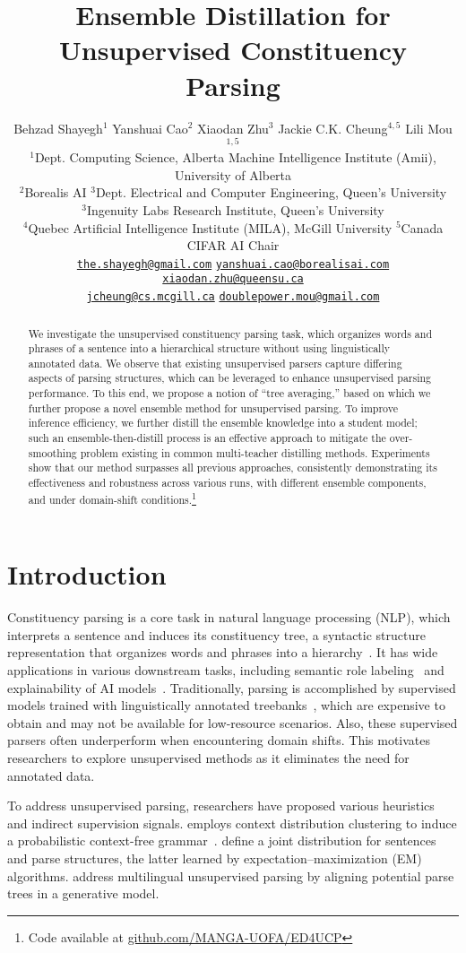 \documentclass{article}
\title{Ensemble Distillation for Unsupervised Constituency Parsing}
\author{Behzad Shayegh$^1$ \;\; Yanshuai Cao$^2$ \;\; Xiaodan Zhu$^{3}$ \;\; Jackie C.K. Cheung$^{4,5}$ \;\; Lili Mou$^{1,5}$
\\
$^1$Dept. Computing Science, Alberta Machine Intelligence Institute (Amii), University of Alberta\\
$^2$Borealis AI\quad
$^3$Dept. Electrical and Computer Engineering, Queen’s University\\
$^3$Ingenuity Labs Research Institute, Queen’s University\\
$^4$Quebec Artificial Intelligence Institute (MILA), McGill University\quad
$^5$Canada CIFAR AI Chair\\
\texttt{\href{mailto:the.shayegh@gmail.com}{the.shayegh@gmail.com}} \quad
\texttt{\href{mailto:yanshuai.cao@borealisai.com}{yanshuai.cao@borealisai.com}}\quad
\texttt{\href{mailto:xiaodan.zhu@queensu.ca}{xiaodan.zhu@queensu.ca}}\\
\texttt{\href{mailto:jcheung@cs.mcgill.ca}{jcheung@cs.mcgill.ca}} \quad
\texttt{\href{mailto:doublepower.mou@gmail.com}{doublepower.mou@gmail.com}}
}
\begin{document}
\maketitle

\begin{abstract}
We investigate the unsupervised constituency parsing task, which organizes words and phrases of a sentence into a hierarchical structure without using linguistically annotated data. We observe that existing unsupervised parsers capture differing aspects of parsing structures, which can be leveraged to enhance unsupervised parsing performance.
To this end, we propose a notion of ``tree averaging,'' based on which we further propose a novel ensemble method for unsupervised parsing.
To improve inference efficiency, we further distill the ensemble knowledge into a student model; such an ensemble-then-distill process is an effective approach to mitigate the over-smoothing problem existing in common multi-teacher distilling methods.
Experiments show that our method surpasses all previous approaches, consistently demonstrating its effectiveness and robustness across various runs, with different ensemble components, and under domain-shift conditions.\footnote{Code available at \href{https://github.com/MANGA-UOFA/ED4UCP}{\url{github.com/MANGA-UOFA/ED4UCP}}}
\end{abstract}


\section{Introduction}
\label{sec:introduction}

Constituency parsing is a core task in natural language processing (NLP), which interprets a sentence and induces its constituency tree, a syntactic structure representation that organizes words and phrases into a hierarchy~\citep{constituencyTree}. It has wide applications in various downstream tasks, including semantic role labeling~\citep{mohammadshahi-henderson-2023-syntax} and explainability of AI models~\citep{tenney-etal-2019-bert}.
Traditionally, parsing is accomplished by supervised models trained with linguistically annotated treebanks~\citep{charniak-2000-maximum}, which are expensive to obtain and may not be available for low-resource scenarios.
Also, these supervised parsers often underperform when encountering domain shifts. 
This motivates researchers to explore unsupervised methods as it eliminates the need for annotated data.

To address unsupervised parsing, researchers have proposed various heuristics and indirect supervision signals. \citet{clark-2001-unsupervised} employs context distribution clustering to induce a probabilistic context-free grammar~\citep[PCFG;][]{Booth1969ProbabilisticRO}. \citet{klein-manning-2002-generative} define a joint distribution for sentences and parse structures, the latter learned by expectation--maximization (EM) algorithms. \citet{snyder2009unsupervised} address multilingual unsupervised parsing by aligning potential parse trees in a generative model.
\end{document}
